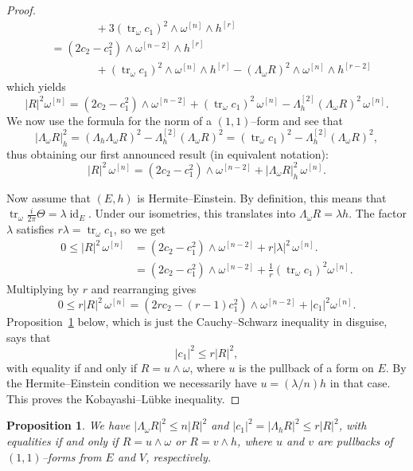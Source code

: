 \documentclass[11pt,a4paper]{amsart}
\def\^#1{^{[#1]}}
\DeclareMathOperator{\tr}{tr}
\DeclareMathOperator{\id}{id}
\def\curv{\frac{i}{2\pi} \Theta}
\newtheorem{prop}[theo]{Proposition}
\theoremstyle{definition}
\numberwithin{equation}{section}
\begin{document}
\begin{proof}
\begin{align*}
    &\qquad\qquad
    {}+ 3 (\tr_\omega c_1)^2 \wedge \omega\^{n} \wedge h\^{r}
    \\
    &= (2 c_2 - c_1^2) \wedge \omega\^{n-2} \wedge h\^{r} 
    \\
    &\qquad\qquad
    + (\tr_\omega c_1)^2 \wedge \omega\^{n} \wedge h\^{r}
    - (\Lambda_\omega R)^2 \wedge \omega\^{n} \wedge h\^{r-2}
\end{align*}
which yields
$$
    \lvert R \rvert^2 \omega\^{n}
    = (2 c_2 - c_1^2) \wedge \omega\^{n-2}
    + (\tr_\omega c_1)^2 \, \omega\^{n}
    - \Lambda\^{2}_h(\Lambda_\omega R)^2 \, \omega\^{n}.
$$
We now use the formula for the norm of a $(1,1)$--form and see that
$$
\lvert \Lambda_\omega R \rvert_h^2
= (\Lambda_h\Lambda_\omega R)^2 - \Lambda\^{2}_h(\Lambda_\omega R)^2
= (\tr_\omega c_1)^2 - \Lambda\^{2}_h(\Lambda_\omega R)^2,
$$
thus obtaining our first announced result (in equivalent notation):
$$
    \lvert R \rvert^2 \, \omega\^{n}
    = (2 c_2 - c_1^2) \wedge \omega\^{n-2}
    + \lvert \Lambda_\omega R \rvert_h^2 \, \omega\^{n}.
$$

Now assume that $(E,h)$ is Hermite--Einstein. By definition, this means
that $\tr_\omega \curv = \lambda \id_{E}$. Under our isometries, this
translates into $\Lambda_\omega R = \lambda h$. The factor $\lambda$
satisfies $r \lambda = \tr_\omega c_1$, so we get
\begin{align*}
    0 \leq 
    \lvert R \rvert^2 \, \omega\^{n}
    &= (2 c_2 - c_1^2) \wedge \omega\^{n-2}
    + r |\lambda|^2 \, \omega\^{n}.
    \\
    &= (2 c_2 - c_1^2) \wedge \omega\^{n-2}
    + \tfrac 1r (\tr_\omega c_1)^2 \omega\^{n}.
\end{align*}
Multiplying by $r$ and rearranging gives 
$$
0 \leq
r \lvert R \rvert^2 \, \omega\^{n}
= (2r c_2 - (r-1)c_1^2) \wedge \omega\^{n-2}
+ \lvert c_1 \rvert^2 \omega\^{n}.
$$
Proposition~\ref{prop:CS} below, which is just the Cauchy--Schwarz
inequality in disguise, says that
$$
\lvert c_1 \rvert^2 \leq r \lvert R \rvert^2,
$$
with equality if and only if $R = u \wedge \omega$, where $u$ is the
pullback of a form on $E$. By the Hermite--Einstein condition we
necessarily have $u = (\lambda/n) h$ in that case. This proves the
Kobayashi--L\"{u}bke inequality.
\end{proof}



\begin{prop}
\label{prop:CS}
We have $\lvert \Lambda_\omega R\rvert^2 \leq n \lvert R \rvert^2$ and
$\lvert c_1 \rvert^2 = \lvert \Lambda_h R\rvert^2 \leq r \lvert R
\rvert^2$, with equalities if and only if $R = u \wedge \omega$ or $R = v
\wedge h$, where $u$ and $v$ are pullbacks of $(1,1)$--forms from $E$ and
$V$, respectively. 
\end{prop}
\end{document}
